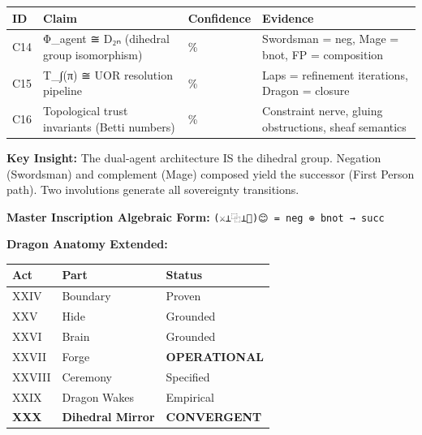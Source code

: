 \documentclass[
  11pt,
]{article}
\newcounter{none} %
\begin{document}
{\def\LTcaptype{none} %
\begin{longtable}[]{@{}
  >{\raggedright\arraybackslash}p{}
  >{\raggedright\arraybackslash}p{}
  >{\raggedright\arraybackslash}p{}
  >{\raggedright\arraybackslash}p{}@{}}
\toprule\noalign{}
\begin{minipage}[b]{\linewidth}\raggedright
ID
\end{minipage} & \begin{minipage}[b]{\linewidth}\raggedright
Claim
\end{minipage} & \begin{minipage}[b]{\linewidth}\raggedright
Confidence
\end{minipage} & \begin{minipage}[b]{\linewidth}\raggedright
Evidence
\end{minipage} \\
\midrule\noalign{}
\endhead
\bottomrule\noalign{}
\endlastfoot
C14 & Φ\_agent ≅ D₂ₙ (dihedral group isomorphism) & 75\% & Swordsman =
neg, Mage = bnot, FP = composition \\
C15 & T\_∫(π) ≅ UOR resolution pipeline & 65\% & Laps = refinement
iterations, Dragon = closure \\
C16 & Topological trust invariants (Betti numbers) & 25\% & Constraint
nerve, gluing obstructions, sheaf semantics \\
\end{longtable}
}

\textbf{Key Insight:} The dual-agent architecture IS the dihedral group.
Negation (Swordsman) and complement (Mage) composed yield the successor
(First Person path). Two involutions generate all sovereignty
transitions.

\textbf{Master Inscription Algebraic Form:}
\texttt{(⚔️⊥⿻⊥🧙)😊\ =\ neg\ ⊕\ bnot\ →\ succ}

\textbf{Dragon Anatomy Extended:}

{\def\LTcaptype{none} %
\begin{longtable}[]{@{}lll@{}}
\toprule\noalign{}
Act & Part & Status \\
\midrule\noalign{}
\endhead
\bottomrule\noalign{}
\endlastfoot
XXIV & Boundary & Proven \\
XXV & Hide & Grounded \\
XXVI & Brain & Grounded \\
XXVII & Forge & \textbf{OPERATIONAL} \\
XXVIII & Ceremony & Specified \\
XXIX & Dragon Wakes & Empirical \\
\textbf{XXX} & \textbf{Dihedral Mirror} & \textbf{CONVERGENT} \\
\end{longtable}
}
\end{document}
